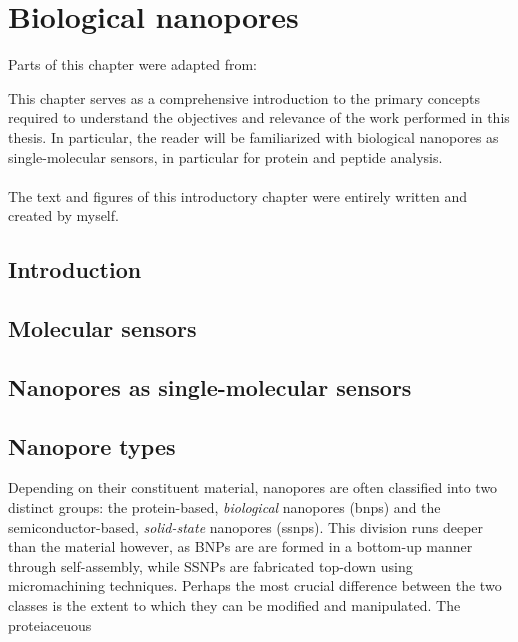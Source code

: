 \chapter{Biological nanopores}\label{ch:nanopores}


\begin{shaded}
Parts of this chapter were adapted from:\\
\newpage
\end{shaded}

This chapter serves as a comprehensive introduction to the primary concepts required to understand the
objectives and relevance of the work performed in this thesis. In particular, the reader will be familiarized
with biological nanopores as single-molecular sensors, in particular for protein and peptide analysis.
\\
\\
The text and figures of this introductory chapter were entirely written and created by myself.

\newpage

\section{Introduction}



\section{Molecular sensors}

\section{Nanopores as single-molecular sensors}



\section{Nanopore types}

Depending on their constituent material, nanopores are often classified into two distinct groups: the protein-based, \emph{biological} nanopores (\glspl{bnp}) and the semiconductor-based, \emph{solid-state} nanopores (\glspl{ssnp}).\cite{Dekker-2007} This division runs deeper than the material however, as BNPs are are formed in a bottom-up manner through self-assembly, while SSNPs are fabricated top-down using micromachining techniques. Perhaps the most crucial difference between the two classes is the extent to which they can be modified and manipulated. The proteiaceuous

